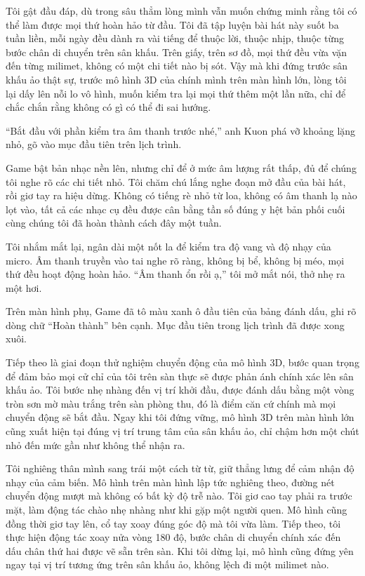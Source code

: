 ﻿\documentclass[../main.tex]{subfiles}
\begin{document}
Tôi gật đầu đáp, dù trong sâu thẳm lòng mình vẫn muốn chứng minh rằng tôi có thể làm được mọi thứ hoàn hảo từ đầu. Tôi đã tập luyện bài hát này suốt ba tuần liền, mỗi ngày đều dành ra vài tiếng để thuộc lời, thuộc nhịp, thuộc từng bước chân di chuyển trên sân khấu. Trên giấy, trên sơ đồ, mọi thứ đều vừa vặn đến từng milimet, không có một chi tiết nào bị sót. Vậy mà khi đứng trước sân khấu ảo thật sự, trước mô hình 3D của chính mình trên màn hình lớn, lòng tôi lại dấy lên nỗi lo vô hình, muốn kiểm tra lại mọi thứ thêm một lần nữa, chỉ để chắc chắn rằng không có gì có thể đi sai hướng.

``Bắt đầu với phần kiểm tra âm thanh trước nhé,'' anh Kuon phá vỡ khoảng lặng nhỏ, gõ vào mục đầu tiên trên lịch trình.

Game bật bản nhạc nền lên, nhưng chỉ để ở mức âm lượng rất thấp, đủ để chúng tôi nghe rõ các chi tiết nhỏ. Tôi chăm chú lắng nghe đoạn mở đầu của bài hát, rồi giơ tay ra hiệu dừng. Không có tiếng rè nhỏ từ loa, không có âm thanh lạ nào lọt vào, tất cả các nhạc cụ đều được cân bằng tần số đúng y hệt bản phối cuối cùng chúng tôi đã hoàn thành cách đây một tuần.

Tôi nhắm mắt lại, ngân dài một nốt la để kiểm tra độ vang và độ nhạy của micro. Âm thanh truyền vào tai nghe rõ ràng, không bị bể, không bị méo, mọi thứ đều hoạt động hoàn hảo. ``Âm thanh ổn rồi ạ,'' tôi mở mắt nói, thở nhẹ ra một hơi.

Trên màn hình phụ, Game đã tô màu xanh ô đầu tiên của bảng đánh dấu, ghi rõ dòng chữ ``Hoàn thành'' bên cạnh. Mục đầu tiên trong lịch trình đã được xong xuôi.

\ct

Tiếp theo là giai đoạn thử nghiệm chuyển động của mô hình 3D, bước quan trọng để đảm bảo mọi cử chỉ của tôi trên sàn thực sẽ được phản ánh chính xác lên sân khấu ảo. Tôi bước nhẹ nhàng đến vị trí khởi đầu, được đánh dấu bằng một vòng tròn sơn mờ màu trắng trên sàn phòng thu, đó là điểm căn cứ chính mà mọi chuyển động sẽ bắt đầu. Ngay khi tôi đứng vững, mô hình 3D trên màn hình lớn cũng xuất hiện tại đúng vị trí trung tâm của sân khấu ảo, chỉ chậm hơn một chút nhỏ đến mức gần như không thể nhận ra.

Tôi nghiêng thân mình sang trái một cách từ từ, giữ thẳng lưng để cảm nhận độ nhạy của cảm biến. Mô hình trên màn hình lập tức nghiêng theo, đường nét chuyển động mượt mà không có bất kỳ độ trễ nào. Tôi giơ cao tay phải ra trước mặt, làm động tác chào nhẹ nhàng như khi gặp một người quen. Mô hình cũng đồng thời giơ tay lên, cổ tay xoay đúng góc độ mà tôi vừa làm. Tiếp theo, tôi thực hiện động tác xoay nửa vòng 180 độ, bước chân di chuyển chính xác đến dấu chân thứ hai được vẽ sẵn trên sàn. Khi tôi dừng lại, mô hình cũng đứng yên ngay tại vị trí tương ứng trên sân khấu ảo, không lệch đi một milimet nào.
\end{document}
